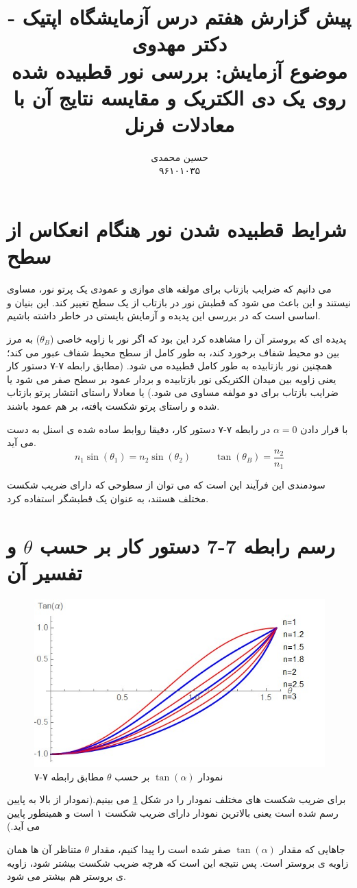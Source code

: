 \documentclass{article}
\title{	
	پیش گزارش هفتم درس آزمایشگاه اپتیک - دکتر مهدوی
	\\
	\small
	موضوع آزمايش: بررسی نور قطبیده شده روی يک دی الکتريک و مقايسه
	نتايج آن با معادلات فرنل
}
\author{
حسین محمدی 
\\
۹۶۱۰۱۰۳۵
}
\begin{document}
\maketitle
\section{شرایط قطبیده شدن نور هنگام انعکاس از سطح}
می دانیم که ضرایب بازتاب برای مولفه های موازی و عمودی یک پرتو نور، مساوی نیستند و این باعث می شود که قطبش نور در بازتاب از یک سطح تغییر کند. این بنیان و اساسی است که در بررسی این پدیده و آزمایش بایستی در خاطر داشته باشیم. 

\noindent
پدیده ای که بروستر آن را مشاهده کرد این بود که اگر نور با زاویه خاصی 
($\theta_B$)
به مرز بین دو محیط شفاف برخورد کند، به طور کامل از سطح محیط شفاف عبور می کند؛ همچنین نور بازتابیده به طور کامل قطبیده می شود. (مطابق رابطه ۷-۷ دستور کار یعنی زاویه بین میدان الکتریکی نور بازتابیده و بردار عمود بر سطح صفر می شود یا ضرایب بازتاب برای دو مولفه مساوی می شود.) یا معادلا  راستای انتشار پرتو بازتاب شده و راستای پرتو شکست یافته، بر هم عمود باشند.

\noindent
با قرار دادن 
$\alpha=0$ 
در رابطه ۷-۷ دستور کار، دقیقا روابط ساده شده ی اسنل به دست می آید.
\[
n_1 \sin(\theta_1) =  n_2 \sin(\theta_2) \ \ \ \ \ \ \ \ \ \ \ \tan(\theta_B) = \frac{n_2}{n_1}
\]


سودمندی این فرآیند این است که می توان از سطوحی که دارای ضریب شکست مختلف هستند، به عنوان یک قطبشگر استفاده کرد.
\section{رسم رابطه 7-7 دستور کار بر حسب 
$\theta$
و تفسیر آن
}
\begin{figure}[h]
	\centering
	\includegraphics[scale=0.8]{1.jpg}
	\caption{نمودار
$\tan (\alpha)$
بر حسب 
$\theta$
مطابق رابطه ۷-۷	
}
	\label{Fig1}
\end{figure}
برای ضریب شکست های مختلف نمودار را در شکل 
\ref{Fig1}
می بینیم.(نمودار از بالا به پایین رسم شده است یعنی بالاترین نمودار دارای ضریب شکست ۱ است و همینطور پایین می آید.)

\noindent
جاهایی که مقدار $\tan (\alpha)$ صفر شده است را پیدا کنیم، مقدار $\theta$ متناظر آن ها همان زاویه ی بروستر است. پس نتیجه این است که هرچه ضریب شکست بیشتر شود، زاویه ی بروستر هم بیشتر می شود.
\end{document}
